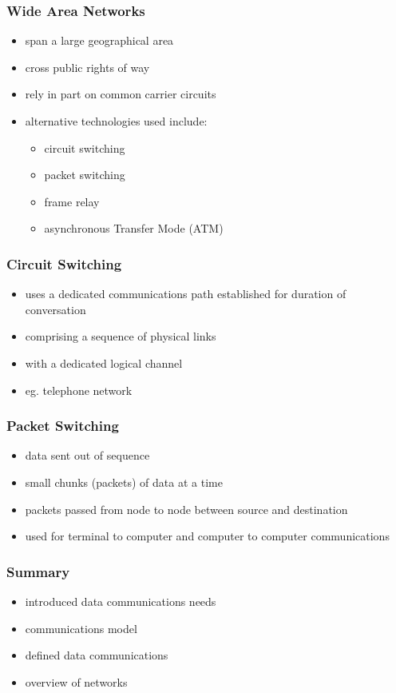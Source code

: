 \documentclass[pdflatex,compress]{beamer}
\begin{document}
\begin{frame}
	\frametitle{Wide Area Networks}
	\begin{itemize}
		\item span a large geographical area
		\item cross public rights of way
		\item rely in part on common carrier circuits
		\item alternative technologies used include:
		\begin{itemize}
			\item circuit switching
			\item packet switching
			\item frame relay
			\item asynchronous Transfer Mode (ATM)
		\end{itemize}
	\end{itemize}
\end{frame}

\begin{frame}
	\frametitle{Circuit Switching}
	\begin{itemize}
		\item uses a dedicated communications path established for duration of conversation
		\item comprising a sequence of physical links
		\item with a dedicated logical channel
		\item eg. telephone network
	\end{itemize}
\end{frame}

\begin{frame}
	\frametitle{Packet Switching}
	\begin{itemize}
		\item data sent out of sequence
		\item small chunks (packets) of data at a time
		\item packets passed from node to node between source and destination
		\item used for terminal to computer and computer to computer communications
	\end{itemize}
\end{frame}

\begin{frame}
	\frametitle{Summary}
	\begin{itemize}
		\item introduced data communications needs
		\item communications model
		\item defined data communications
		\item overview of networks
	\end{itemize}
\end{frame}
\end{document}
